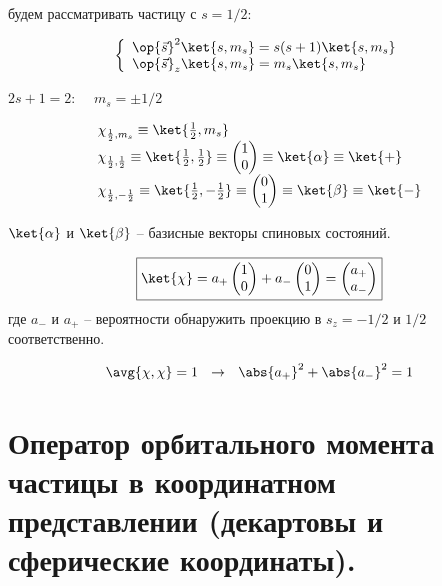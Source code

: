 будем рассматривать частицу с $s = 1/2$:

\begin{equation}
\label{eq:8_3_1}
\left\{
\begin{array}{l}
\op{\vec{s}}^2 \ket{s, m_s} = s(s+1) \ket{s, m_s}\\
\op{\vec{s}}_z \ket{s, m_s} = m_s \ket{s, m_s}
\end{array}
\right.
\end{equation}

$2s + 1 = 2$:~~ $m_s = \pm 1/2$

\begin{equation}
\label{eq:8_3_2}
  \begin{array}{l}
  \chi_{\frac{1}{2}, m_s} \equiv \ket{\frac{1}{2}, m_s}\\
  \chi_{\frac{1}{2}, \frac{1}{2}} \equiv \ket{\frac{1}{2}, \frac{1}{2}} \equiv \begin{pmatrix} 1 \\ 0 \end{pmatrix}    \equiv \ket{\alpha} \equiv \ket{+}\\
  \chi_{\frac{1}{2}, -\frac{1}{2}} \equiv \ket{\frac{1}{2}, -\frac{1}{2}} \equiv \begin{pmatrix} 0 \\ 1 \end{pmatrix}   \equiv \ket{\beta} \equiv \ket{-}
\end{array}
\end{equation}

$\ket{\alpha}$ и $\ket{\beta}$ -- базисные векторы спиновых состояний.

\begin{equation}
\label{eq:8_3_3}
\boxed{
	\ket{\chi} = a_{+} \begin{pmatrix} 1 \\ 0 \end{pmatrix} + a_{-} \begin{pmatrix} 0 \\ 1 \end{pmatrix} = \begin{pmatrix} a_{+} \\ a_{-} \end{pmatrix}
}
\end{equation}
где $a_{-}$ и $a_{+}$ -- вероятности обнаружить проекцию в $s_z = -1/2$ и $1/2$ соответственно.

$$
\avg{\chi, \chi} = 1 ~~\rightarrow ~~ \abs{a_{+}}^2 + \abs{a_{-}}^2 = 1
$$

\section{Оператор орбитального момента частицы в координатном представлении (декартовы и сферические координаты).}

